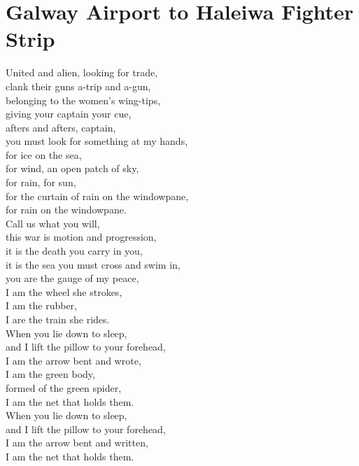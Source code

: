 \documentclass[smalldemyvopaper,11pt,twoside,onecolumn,openright,extrafontsizes]{memoir}
\begin{document}
\chapter{Galway Airport to Haleiwa Fighter Strip}
United and alien, looking for trade,
\\clank their guns a-trip and a-gun,
\\belonging to the women's wing-tips,
\\giving your captain your cue,
\\afters and afters, captain,
\\you must look for something at my hands,
\\for ice on the sea,
\\for wind, an open patch of sky,
\\for rain, for sun,
\\for the curtain of rain on the windowpane,
\\for rain on the windowpane.
\\Call us what you will,
\\this war is motion and progression,
\\it is the death you carry in you,
\\it is the sea you must cross and swim in,
\\you are the gauge of my peace,
\\I am the wheel she strokes,
\\I am the rubber,
\\I are the train she rides.
\\When you lie down to sleep,
\\and I lift the pillow to your forehead,
\\I am the arrow bent and wrote,
\\I am the green body,
\\formed of the green spider,
\\I am the net that holds them.
\\When you lie down to sleep,
\\and I lift the pillow to your forehead,
\\I am the arrow bent and written,
\\I am the net that holds them.
\end{document}
